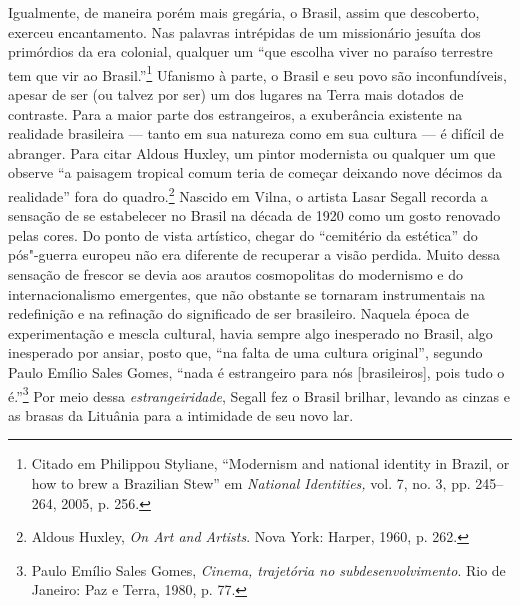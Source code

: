 Igualmente, de maneira porém mais gregária, o Brasil, assim que
descoberto, exerceu encantamento. Nas palavras intrépidas de um
missionário jesuíta dos primórdios da era colonial, qualquer um ``que
escolha viver no paraíso terrestre tem que vir ao Brasil.''\footnote{Citado
  em Philippou Styliane, ``Modernism and national identity in Brazil, or
  how to brew a Brazilian Stew'' em \textit{National Identities,} vol. 7,
  no. 3, pp. 245--264, 2005, p. 256.} Ufanismo à parte, o Brasil e seu
povo são inconfundíveis, apesar de ser (ou talvez por ser) um dos
lugares na Terra mais dotados de contraste. Para a maior parte dos
estrangeiros, a exuberância existente na realidade brasileira --- tanto em
sua natureza como em sua cultura --- é difícil de abranger. Para citar
Aldous Huxley, um pintor modernista ou qualquer um que observe ``a
paisagem tropical comum teria de começar deixando nove décimos da
realidade'' fora do quadro.\footnote{Aldous Huxley, \textit{On Art and
  Artists}. Nova York: Harper, 1960, p. 262.} Nascido em Vilna, o artista
Lasar Segall recorda a sensação de se estabelecer no Brasil na década de
1920 como um gosto renovado pelas cores. Do ponto de vista artístico,
chegar do ``cemitério da estética'' do pós"-guerra europeu não era
diferente de recuperar a visão perdida. Muito dessa sensação de frescor
se devia aos arautos cosmopolitas do modernismo e do internacionalismo
emergentes, que não obstante se tornaram instrumentais na redefinição e
na refinação do significado de ser brasileiro. Naquela época de
experimentação e mescla cultural, havia sempre algo inesperado no
Brasil, algo inesperado por ansiar, posto que, ``na falta de uma cultura
original'', segundo Paulo Emílio Sales Gomes, ``nada é estrangeiro para
nós {[}brasileiros{]}, pois tudo o é.''\footnote{Paulo Emílio
Sales Gomes, \textit{Cinema, trajetória no subdesenvolvimento}. Rio de
Janeiro: Paz e Terra, 1980, p. 77.} Por meio dessa \textit{estrangeiridade},
Segall fez o Brasil brilhar, levando as cinzas e as brasas da Lituânia
para a intimidade de seu novo lar.

